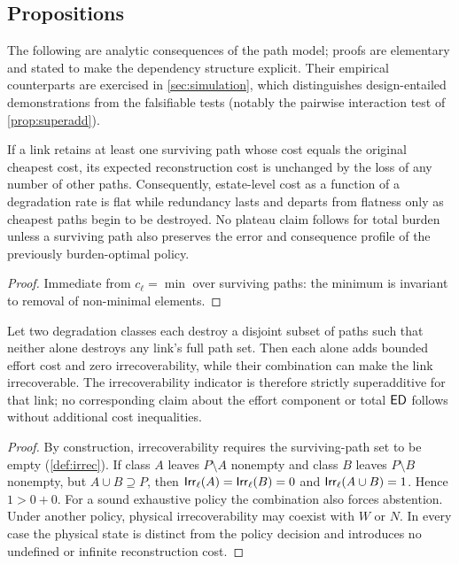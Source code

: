 \subsection{Propositions}
\label{sec:model-props}

The following are analytic consequences of the path model; proofs are elementary
and stated to make the dependency structure explicit. Their empirical counterparts
are exercised in \cref{sec:simulation}, which distinguishes design-entailed
demonstrations from the falsifiable tests (notably the pairwise interaction test
of \cref{prop:superadd}).

\begin{proposition}
\label{prop:plateau}
If a link retains at least one surviving path whose cost equals the original
cheapest cost, its expected reconstruction cost is unchanged by the loss of any
number of other paths. Consequently, estate-level cost as a function of a
degradation rate is flat while redundancy lasts and departs from flatness only as
cheapest paths begin to be destroyed. No plateau claim follows for total burden
unless a surviving path also preserves the error and consequence profile of the
previously burden-optimal policy.
\end{proposition}
\begin{proof}
Immediate from $c_\ell = \min$ over surviving paths: the minimum is invariant to
removal of non-minimal elements.
\end{proof}

\begin{proposition}
\label{prop:superadd}
Let two degradation classes each destroy a disjoint subset of paths such that
neither alone destroys any link's full path set. Then each alone adds bounded
effort cost and zero irrecoverability, while their combination can make the link
irrecoverable. The irrecoverability indicator is therefore strictly superadditive
for that link; no corresponding claim about the effort component or total $\mathsf{ED}$
follows without additional cost inequalities.
\end{proposition}
\begin{proof}
By construction, irrecoverability requires the surviving-path set to be empty
(\cref{def:irrec}). If class $A$ leaves $P \setminus A$ nonempty and class $B$
leaves $P \setminus B$ nonempty, but $A \cup B \supseteq P$, then
$\mathsf{Irr}_\ell(A)=\mathsf{Irr}_\ell(B)=0$ and $\mathsf{Irr}_\ell(A\cup B)=1$. Hence $1>0+0$.
For a sound exhaustive policy the combination also forces abstention. Under another
policy, physical irrecoverability may coexist with $W$ or $N$. In every case the
physical state is distinct from the policy decision and introduces no undefined or
infinite reconstruction cost.
\end{proof}

